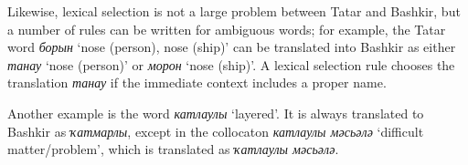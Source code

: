 \documentclass[11pt]{article}
\begin{document}
Likewise, lexical selection is not a large problem between Tatar and Bashkir, but a 
number of rules can be written for ambiguous words; for example, the Tatar 
word \emph{борын} `nose (person), nose (ship)' can be translated into Bashkir 
as either \emph{танау} `nose (person)' or \emph{морон} `nose (ship)'. A lexical selection
rule chooses the translation \emph{танау} if the immediate context includes a proper 
name.

Another example is the word \emph{катлаулы} `layered'.  It is always translated to Bashkir 
as \emph{{\qipa ҡ}атмарлы}, except in the collocaton \emph{катлаулы мәсьәлә} `difficult matter/problem', which is translated as \emph{{\qipa ҡ}атлаулы мәсьәлә}.

\end{document}
